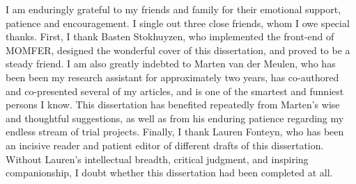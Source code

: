I am enduringly grateful to my friends and family for their emotional support, patience and  encouragement. I single out three close friends, whom I owe special thanks. First, I thank Basten Stokhuyzen, who implemented the front-end of MOMFER, designed the wonderful cover of this dissertation, and proved to be a steady friend. I am also greatly indebted to Marten van der Meulen, who has been been my research assistant for approximately two years, has co-authored and co-presented several of my articles, and is one of the smartest and funniest persons I know. This dissertation has benefited repeatedly from Marten's wise and thoughtful suggestions, as well as from his enduring patience regarding my endless stream of trial projects. Finally, I thank Lauren Fonteyn, who has been an incisive reader and patient editor of different drafts of this dissertation. Without Lauren's intellectual breadth, critical judgment, and inspiring companionship, I doubt whether this dissertation had been completed at all.